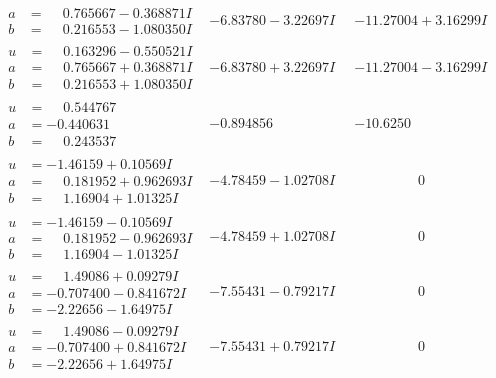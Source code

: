 \documentclass[1p]{elsarticle_modified}
\theoremstyle{definition}
\begin{document}
$$\begin{array}{c|c|c}
\begin{aligned}
a &= \phantom{-}0.765667 - 0.368871 I \\
b &= \phantom{-}0.216553 - 1.080350 I\end{aligned}
 & -6.83780 - 3.22697 I & -11.27004 + 3.16299 I \\ \hline\begin{aligned}
u &= \phantom{-}0.163296 - 0.550521 I \\
a &= \phantom{-}0.765667 + 0.368871 I \\
b &= \phantom{-}0.216553 + 1.080350 I\end{aligned}
 & -6.83780 + 3.22697 I & -11.27004 - 3.16299 I \\ \hline\begin{aligned}
u &= \phantom{-}0.544767\phantom{ +0.000000I} \\
a &= -0.440631\phantom{ +0.000000I} \\
b &= \phantom{-}0.243537\phantom{ +0.000000I}\end{aligned}
 & -0.894856\phantom{ +0.000000I} & -10.6250\phantom{ +0.000000I} \\ \hline\begin{aligned}
u &= -1.46159 + 0.10569 I \\
a &= \phantom{-}0.181952 + 0.962693 I \\
b &= \phantom{-}1.16904 + 1.01325 I\end{aligned}
 & -4.78459 - 1.02708 I & \phantom{-0.000000 } 0 \\ \hline\begin{aligned}
u &= -1.46159 - 0.10569 I \\
a &= \phantom{-}0.181952 - 0.962693 I \\
b &= \phantom{-}1.16904 - 1.01325 I\end{aligned}
 & -4.78459 + 1.02708 I & \phantom{-0.000000 } 0 \\ \hline\begin{aligned}
u &= \phantom{-}1.49086 + 0.09279 I \\
a &= -0.707400 - 0.841672 I \\
b &= -2.22656 - 1.64975 I\end{aligned}
 & -7.55431 - 0.79217 I & \phantom{-0.000000 } 0 \\ \hline\begin{aligned}
u &= \phantom{-}1.49086 - 0.09279 I \\
a &= -0.707400 + 0.841672 I \\
b &= -2.22656 + 1.64975 I\end{aligned}
 & -7.55431 + 0.79217 I & \phantom{-0.000000 } 0 \\ \hline\begin{aligned}

\end{aligned}
\end{array}$$
\end{document}
